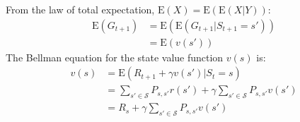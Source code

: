 \documentclass{article}
\begin{document}
From the law of total expectation, $ \text{E}(X) = \text{E}(\text{E}(X|Y)) $:
\begin{equation*}
\begin{split}
\text{E}(G_{t+1}) & = \text{E}(\text{E}(G_{t+1}|S_{t+1} = s')) \\
& = \text{E}(v(s'))
\end{split}
\end{equation*}
The Bellman equation for the state value function $ v(s) $ is:
\begin{equation*}
\begin{split}
v(s) & = \text{E}(R_{t+1} + \gamma v(s') | S_t = s) \\
 & = \sum_{s' \in \mathcal{S}} P_{s,s'} r(s') + \gamma \sum_{s' \in \mathcal{S}} P_{s,s'} v(s') \\
 & = R_s + \gamma \sum_{s' \in \mathcal{S}} P_{s,s'} v(s')
\end{split}
\end{equation*}
\end{document}
